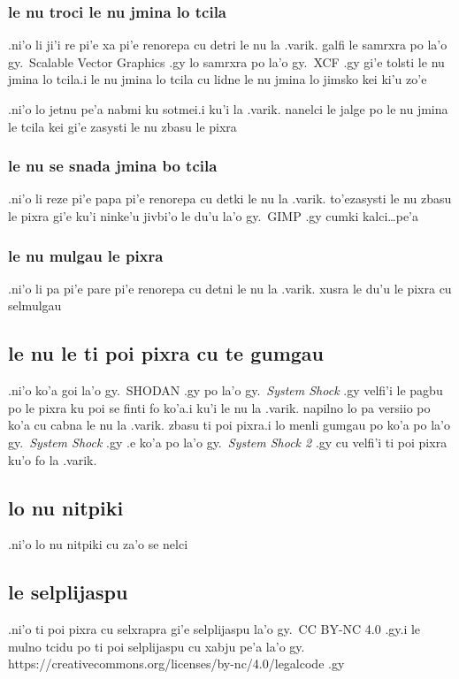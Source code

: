\documentclass{report}
\begin{document}
\subsubsection{le nu troci le nu jmina lo tcila}
.ni'o li ji'i re pi'e xa pi'e renorepa cu detri le nu la .varik. galfi le samrxra po la'o gy.\ Scalable Vector Graphics .gy lo samrxra po la'o gy.\ XCF .gy gi'e tolsti le nu jmina lo tcila\@  .i le nu jmina lo tcila cu lidne le nu jmina lo jimsko kei ki'u zo'e

.ni'o lo jetnu pe'a nabmi ku sotmei\@  .i ku'i la .varik. nanelci le jalge po le nu jmina le tcila kei gi'e zasysti le nu zbasu le pixra

\subsubsection{le nu se snada jmina bo tcila}
.ni'o li reze pi'e papa pi'e renorepa cu detki le nu la .varik. to'ezasysti le nu zbasu le pixra gi'e ku'i ninke'u jivbi'o le du'u la'o gy.\ GIMP .gy cumki kalci\ldots pe'a

\subsubsection{le nu mulgau le pixra}
.ni'o li pa pi'e pare pi'e renorepa cu detni le nu la .varik. xusra le du'u le pixra cu selmulgau

\subsection{le nu le ti poi pixra cu te gumgau}
.ni'o ko'a goi la'o gy.\ SHODAN .gy po la'o gy.\ \textit{System Shock} .gy velfi'i le pagbu po le pixra ku poi se finti fo ko'a\@  .i ku'i le nu la .varik. napilno lo pa versiio po ko'a cu cabna le nu la .varik. zbasu ti poi pixra\@  .i lo menli gumgau po ko'a po la'o gy.\ \textit{System Shock} .gy .e ko'a po la'o gy.\ \textit{System Shock 2} .gy cu velfi'i ti poi pixra ku'o fo la .varik.
\subsection{lo nu nitpiki}
.ni'o lo nu nitpiki cu za'o se nelci

\subsection{le selplijaspu}
.ni'o ti poi pixra cu selxrapra gi'e selplijaspu la'o gy.\ CC BY-NC 4.0 .gy\@ .i le mulno tcidu po ti poi selplijaspu cu xabju pe'a la'o gy. https://creativecommons.org/licenses/by-nc/4.0/legalcode .gy
\end{document}

